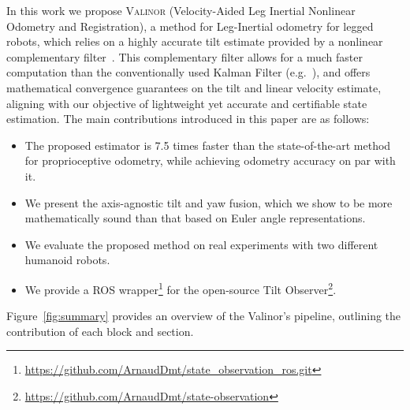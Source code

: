 \documentclass{IJCAS}
\begin{document}
In this work we propose {\scshape Valinor} (Velocity-Aided Leg Inertial Nonlinear Odometry and Registration), a method for Leg-Inertial odometry for legged robots, which relies on a highly accurate tilt estimate provided by a nonlinear complementary filter~\cite{benallegue2020LyapunovStableOrientationEstimatorHumanoids}. This complementary filter allows for a much faster computation than the conventionally used Kalman Filter (e.g.~\cite{Hartley2020RIEKF}), and offers mathematical convergence guarantees on the tilt and linear velocity estimate, aligning with our objective of lightweight yet accurate and certifiable state estimation.
The main contributions introduced in this paper are as follows:
\begin{itemize}[leftmargin=0em]
  \item The proposed estimator is 7.5 times faster than the state-of-the-art method for proprioceptive odometry, while achieving odometry accuracy on par with it.
  \item We present the axis-agnostic tilt and yaw fusion, which we show to be more mathematically sound than that based on Euler angle representations.
  \item We evaluate the proposed method on real experiments with two different humanoid robots.
  \item We provide a ROS wrapper\footnote{\scriptsize \url{https://github.com/ArnaudDmt/state_observation_ros.git}} for the open-source Tilt Observer\footnote{\scriptsize \url{https://github.com/ArnaudDmt/state-observation}}.
\end{itemize}
\noindent Figure~\ref{fig:summary} provides an overview of the Valinor's pipeline, outlining the contribution of each block and section.
\end{document}
